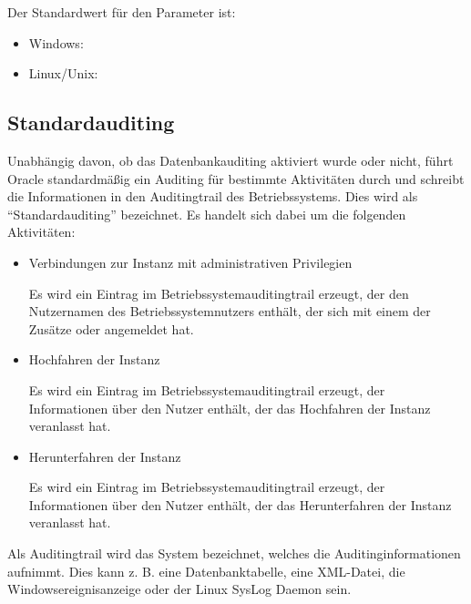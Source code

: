           Der Standardwert f\"ur den Parameter  ist:
          \begin{itemize}
            \item Windows: 
            \item Linux/Unix: 
          \end{itemize}

      \begin{literaturinternet}
        \item \cite{085271}
      \end{literaturinternet}
      \subsection{Standardauditing}
        Unabh\"angig davon, ob das Datenbankauditing aktiviert wurde oder nicht, f\"uhrt Oracle standardm\"a\ss{}ig ein Auditing f\"ur bestimmte Aktivit\"aten durch und schreibt die Informationen in den Auditingtrail des Betriebssystems. Dies wird als \enquote{Standardauditing} bezeichnet. Es handelt sich dabei um die folgenden Aktivit\"aten:
        \begin{itemize}
          \item Verbindungen zur Instanz mit administrativen Privilegien

            Es wird ein Eintrag im Betriebssystemauditingtrail erzeugt, der den Nutzernamen des Betriebssystemnutzers enth\"alt, der sich mit einem der Zus\"atze  oder  angemeldet hat.
          \item Hochfahren der Instanz

            Es wird ein Eintrag im Betriebssystemauditingtrail erzeugt, der Informationen \"uber den Nutzer enth\"alt, der das Hochfahren der Instanz veranlasst hat.
          \item Herunterfahren der Instanz

            Es wird ein Eintrag im Betriebssystemauditingtrail erzeugt, der Informationen \"uber den Nutzer enth\"alt, der das Herunterfahren der Instanz veranlasst hat.
        \end{itemize}
        \begin{merke}
          Als Auditingtrail wird das System bezeichnet, welches die Auditinginformationen aufnimmt. Dies kann z. B. eine Datenbanktabelle, eine XML-Datei, die Windowsereignisanzeige oder der Linux SysLog Daemon sein.
        \end{merke}
